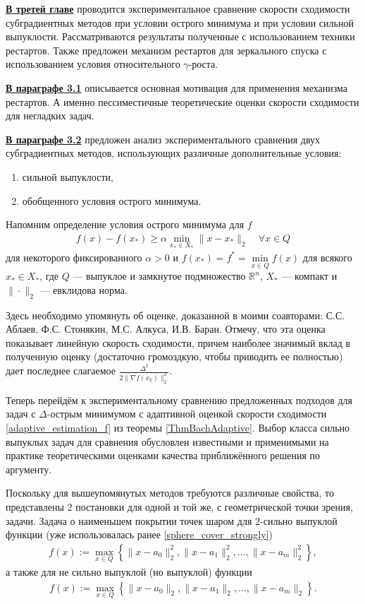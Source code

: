 \underline{\textbf{В третей главе}} проводится экспериментальное сравнение скорости сходимости субградиентных методов при условии острого минимума и при условии сильной выпуклости. Рассматриваются результаты полученные с использованием техники рестартов. Также предложен механизм рестартов для зеркального спуска с использованием условия относительного $\gamma$-роста. 

\underline{\textbf{В параграфе 3.1}} описывается основная мотивация для применения механизма рестартов. А именно пессиместичные теоретические оценки скорости сходимости для негладких задач. 

\underline{\textbf{В параграфе 3.2}} предложен анализ экспериментального сравнения двух субградиентных методов, использующих различные дополнительные условия:
\begin{enumerate}
    \item сильной выпуклости,
    \item обобщенного условия острого минимума.
\end{enumerate}

Напомним определение условия острого минимума для $f$
\begin{gather}\label{sm}
    f(x) - f(x_*) \geq \alpha \min_{x_* \in X_*} \|x- x_*\|_2 \quad \forall x \in Q
\end{gather}
для некоторого фиксированного $\alpha >0$ и $f(x_*) = f^* = \min\limits_{x\in Q} f(x)$ для всякого $x_* \in X_*$, где $Q$ --- выпуклое и замкнутое подмножество $\mathbb{R}^n$, $X_*$ --- компакт и $\|\cdot\|_2$ --- евклидова норма. 

Здесь необходимо упомянуть об оценке, доказанной в \cite{sharp22} моими соавторами: С.С. Аблаев, Ф.С. Стонякин, М.С. Алкуса, И.В. Баран. Отмечу, что эта оценка показывает линейную скорость сходимости, причем наиболее значимый вклад в полученную оценку (достаточно громоздкую, чтобы приводить ее полностью) дает последнее слагаемое $\frac{\Delta^2}{2\|\nabla f(x_k)\|^2_2}$. 

Теперь перейдём к экспериментальному сравнению предложенных подходов для задач с $\Delta$-острым минимумом с адаптивной оценкой скорости сходимости \eqref{adaptive_estimation_f} из теоремы \ref{ThmBachAdaptive}. Выбор класса сильно выпуклых задач для сравнения обусловлен известными и  применимыми на практике теоретическими оценками качества приближённого решения по аргументу. 

Поскольку для вышеупомянутых методов требуются различные свойства, то представлены 2 постановки для одной и той же, с геометрической точки зрения, задачи. Задача о наименьшем покрытии точек шаром для $2$-сильно выпуклой функции (уже использовалась ранее \eqref{sphere_cover_strongly})
\begin{gather}
    f(x) := \max_{x\in Q}\left\{\|x - a_0\|_2^2, \|x - a_1\|_2^2, ..., \|x - a_m\|_2^2\right\},
\end{gather}
а также для не сильно выпуклой (но выпуклой) функции
\begin{gather}\label{sphere_cover}
    f(x) := \max_{x\in Q}\left\{\|x - a_0\|_2, \|x - a_1\|_2, ..., \|x - a_m\|_2\right\}.
\end{gather}


